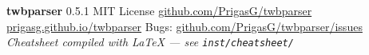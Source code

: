 \documentclass[10pt,landscape]{article}
\begin{document}
\begin{tcolorbox}[
  colback=twbBlue!10, colframe=twbBlue!30,
  coltext=twbGray, arc=2pt,
  top=2pt, bottom=2pt, left=4pt, right=4pt,
  before skip=2pt, after skip=0pt
]
  \scriptsize
  \textbf{twbparser} \textcolor{twbMid}{0.5.1} \quad
  MIT License \quad
  \href{https://github.com/PrigasG/twbparser}{github.com/PrigasG/twbparser} \quad
  \href{https://prigasg.github.io/twbparser/}{prigasg.github.io/twbparser} \quad
  Bugs: \href{https://github.com/PrigasG/twbparser/issues}{github.com/PrigasG/twbparser/issues}
  \hfill
  \textit{Cheatsheet compiled with \LaTeX{} — see \texttt{inst/cheatsheet/}}
\end{tcolorbox}
\end{document}
